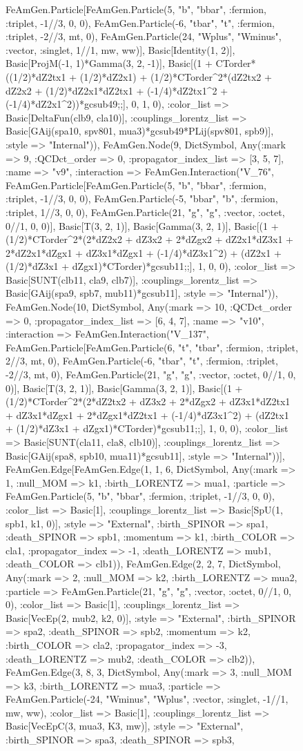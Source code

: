 \documentclass{revtex4}
\begin{document}
\begin{figure}[!htb]
\begin{center}
{FeAmGen.Particle[FeAmGen.Particle(5, "b", "bbar", :fermion, :triplet, -1//3, 0, 0), FeAmGen.Particle(-6, "tbar", "t", :fermion, :triplet, -2//3, mt, 0), FeAmGen.Particle(24, "Wplus", "Wminus", :vector, :singlet, 1//1, mw, ww)], Basic[Identity(1, 2)], Basic[ProjM(-1, 1)*Gamma(3, 2, -1)], Basic[(1 + CTorder*((1/2)*dZ2tx1 + (1/2)*dZ2x1) + (1/2)*CTorder^2*(dZ2tx2 + dZ2x2 + (1/2)*dZ2x1*dZ2tx1 + (-1/4)*dZ2tx1^2 + (-1/4)*dZ2x1^2))*gcsub49;;], 0, 1, 0), :color_list => Basic[DeltaFun(clb9, cla10)], :couplings_lorentz_list => Basic[GAij(spa10, spv801, mua3)*gcsub49*PLij(spv801, spb9)], :style => "Internal")), FeAmGen.Node(9, Dict{Symbol, Any}(:mark => 9, :QCDct_order => 0, :propagator_index_list => [3, 5, 7], :name => "v9", :interaction => FeAmGen.Interaction("V_76", FeAmGen.Particle[FeAmGen.Particle(5, "b", "bbar", :fermion, :triplet, -1//3, 0, 0), FeAmGen.Particle(-5, "bbar", "b", :fermion, :triplet, 1//3, 0, 0), FeAmGen.Particle(21, "g", "g", :vector, :octet, 0//1, 0, 0)], Basic[T(3, 2, 1)], Basic[Gamma(3, 2, 1)], Basic[(1 + (1/2)*CTorder^2*(2*dZ2x2 + dZ3x2 + 2*dZgx2 + dZ2x1*dZ3x1 + 2*dZ2x1*dZgx1 + dZ3x1*dZgx1 + (-1/4)*dZ3x1^2) + (dZ2x1 + (1/2)*dZ3x1 + dZgx1)*CTorder)*gcsub11;;], 1, 0, 0), :color_list => Basic[SUNT(clb11, cla9, clb7)], :couplings_lorentz_list => Basic[GAij(spa9, spb7, mub11)*gcsub11], :style => "Internal")), FeAmGen.Node(10, Dict{Symbol, Any}(:mark => 10, :QCDct_order => 0, :propagator_index_list => [6, 4, 7], :name => "v10", :interaction => FeAmGen.Interaction("V_137", FeAmGen.Particle[FeAmGen.Particle(6, "t", "tbar", :fermion, :triplet, 2//3, mt, 0), FeAmGen.Particle(-6, "tbar", "t", :fermion, :triplet, -2//3, mt, 0), FeAmGen.Particle(21, "g", "g", :vector, :octet, 0//1, 0, 0)], Basic[T(3, 2, 1)], Basic[Gamma(3, 2, 1)], Basic[(1 + (1/2)*CTorder^2*(2*dZ2tx2 + dZ3x2 + 2*dZgx2 + dZ3x1*dZ2tx1 + dZ3x1*dZgx1 + 2*dZgx1*dZ2tx1 + (-1/4)*dZ3x1^2) + (dZ2tx1 + (1/2)*dZ3x1 + dZgx1)*CTorder)*gcsub11;;], 1, 0, 0), :color_list => Basic[SUNT(cla11, cla8, clb10)], :couplings_lorentz_list => Basic[GAij(spa8, spb10, mua11)*gcsub11], :style => "Internal"))], FeAmGen.Edge[FeAmGen.Edge(1, 1, 6, Dict{Symbol, Any}(:mark => 1, :null_MOM => k1, :birth_LORENTZ => mua1, :particle => FeAmGen.Particle(5, "b", "bbar", :fermion, :triplet, -1//3, 0, 0), :color_list => Basic[1], :couplings_lorentz_list => Basic[SpU(1, spb1, k1, 0)], :style => "External", :birth_SPINOR => spa1, :death_SPINOR => spb1, :momentum => k1, :birth_COLOR => cla1, :propagator_index => -1, :death_LORENTZ => mub1, :death_COLOR => clb1)), FeAmGen.Edge(2, 2, 7, Dict{Symbol, Any}(:mark => 2, :null_MOM => k2, :birth_LORENTZ => mua2, :particle => FeAmGen.Particle(21, "g", "g", :vector, :octet, 0//1, 0, 0), :color_list => Basic[1], :couplings_lorentz_list => Basic[VecEp(2, mub2, k2, 0)], :style => "External", :birth_SPINOR => spa2, :death_SPINOR => spb2, :momentum => k2, :birth_COLOR => cla2, :propagator_index => -3, :death_LORENTZ => mub2, :death_COLOR => clb2)), FeAmGen.Edge(3, 8, 3, Dict{Symbol, Any}(:mark => 3, :null_MOM => k3, :birth_LORENTZ => mua3, :particle => FeAmGen.Particle(-24, "Wminus", "Wplus", :vector, :singlet, -1//1, mw, ww), :color_list => Basic[1], :couplings_lorentz_list => Basic[VecEpC(3, mua3, K3, mw)], :style => "External", :birth_SPINOR => spa3, :death_SPINOR => spb3, }
\end{center}
\end{figure}
\end{document}
